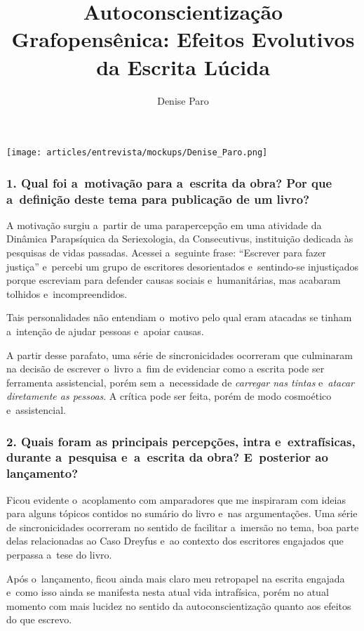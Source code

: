 \documentclass{gescons}
\author{Denise Paro}
\title{Autoconscientização Grafopensênica: Efeitos Evolutivos da Escrita Lúcida}
\begin{document}
    \makeentrevistatitle

    \begin{multicols}{2}

\begin{center}
    \texttt{[image: articles/entrevista/mockups/Denise\_Paro.png]}
\end{center}

\subsubsection{1. Qual foi a~motivação para a~escrita da obra? Por que a~definição deste tema para publicação de um livro?}

A motivação surgiu a~partir de uma parapercepção em uma atividade da
Dinâmica Parapsíquica da Seriexologia, da Consecutivus, instituição
dedicada às pesquisas de vidas passadas. Acessei a~seguinte frase:
``Escrever para fazer justiça'' e~percebi um grupo de escritores
desorientados e~sentindo-se injustiçados porque escreviam para defender
causas sociais e~humanitárias, mas acabaram tolhidos e~incompreendidos.

Tais personalidades não entendiam o~motivo pelo qual eram atacadas se
tinham a~intenção de ajudar pessoas e~apoiar causas.

A partir desse parafato, uma série de sincronicidades ocorreram que
culminaram na decisão de escrever o~livro a~fim de evidenciar como a
escrita pode ser ferramenta assistencial, porém sem a~necessidade de
\emph{carregar nas tintas} e~\emph{atacar diretamente as pessoas}. A
crítica pode ser feita, porém de modo cosmoético e~assistencial.

\subsubsection{2. Quais foram as principais percepções, intra e~extrafísicas, durante a~pesquisa e~a~escrita da obra? E~posterior ao lançamento?}

Ficou evidente o~acoplamento com amparadores que me inspiraram com
ideias para alguns tópicos contidos no sumário do livro e~nas
argumentações. Uma série de sincronicidades ocorreram no sentido de
facilitar a~imersão no tema, boa parte delas relacionadas ao Caso
Dreyfus e~ao contexto dos escritores engajados que perpassa a~tese do
livro.

Após o~lançamento, ficou ainda mais claro meu retropapel na escrita
engajada e~como isso ainda se manifesta nesta atual vida intrafísica,
porém no atual momento com mais lucidez no sentido da
autoconscientização quanto aos efeitos do que escrevo.


\end{multicols}
\end{document}
